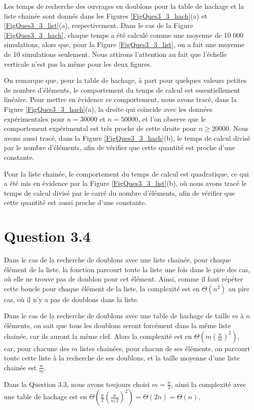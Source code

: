 \documentclass[a4paper,12pt]{article}
\numberwithin{equation}{section}
\begin{document}
Les temps de recherche des ouvrages en doublons pour la table de hachage et la liste chainée sont donnés dans les Figures \ref{FigQues3_3_hach}(a) et \ref{FigQues3_3_list}(a), respectivement. Dans le cas de la Figure \ref{FigQues3_3_hach}, chaque temps a été calculé comme une moyenne de 10 000 simulations, alors que, pour la Figure \ref{FigQues3_3_list}, on a fait une moyenne de 10 simulations seulement. Nous attirons l'attention au fait que l'échelle verticale n'est pas la même pour les deux figures.

On remarque que, pour la table de hachage, à part pour quelques valeurs petites de nombre d'éléments, le comportement du temps de calcul est essentiellement linéaire. Pour mettre en évidence ce comportement, nous avons tracé, dans la Figure \ref{FigQues3_3_hach}(a), la droite qui coïncide avec les données expérimentales pour $n = 30000$ et $n = 50000$, et l'on observe que le comportement expérimental est très proche de cette droite pour $n \geq 20000$. Nous avons aussi tracé, dans la Figure \ref{FigQues3_3_hach}(b), le temps de calcul divisé par le nombre d'éléments, afin de vérifier que cette quantité est proche d'une constante.

Pour la liste chainée, le comportement du temps de calcul est quadratique, ce qui a été mis en évidence par la Figure \ref{FigQues3_3_list}(b), où nous avons tracé le temps de calcul divisé par le carré du nombre d'éléments, afin de vérifier que cette quantité est aussi proche d'une constante.

\section*{Question 3.4}

Dans le cas de la recherche de doublons avec une liste chainée, pour chaque élément de la liste, la fonction parcourt toute la liste une fois dans le pire des cas, où elle ne trouve pas de doublon pour cet élément. Ainsi, comme il faut répéter cette boucle pour chaque élément de la liste, la complexité est en $\Theta(n^2)$ au pire cas, où il n'y a pas de doublons dans la liste.

Dans le cas de la recherche de doublons avec une table de hachage de taille $m$ à $n$ éléments, on sait que tous les doublons seront forcément dans la même liste chainée, car ils auront la même clef. Alors la complexité est en $\Theta\left(m \left(\frac{n}{m}\right)^2\right)$, car, pour chacune des $m$ listes chainées, pour chacun de ses éléments, on parcourt toute cette liste à la recherche de ses doublons, et la taille moyenne d'une liste chainée est $\frac{n}{m}$.

Dans la Question 3.3, nous avons toujours choisi $m = \frac{n}{2}$, ainsi la complexité avec une table de hachage est en $\Theta\left(\frac{n}{2}\left(\frac{n}{n/2}\right)^2\right) = \Theta(2n) = \Theta(n)$.
\end{document}
